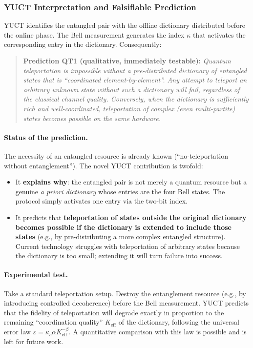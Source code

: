 \documentclass[12pt,a4paper]{article}
\theoremstyle{remark}
\begin{document}
	\subsubsection{YUCT Interpretation and Falsifiable Prediction}
	
	YUCT identifies the entangled pair with the offline dictionary distributed before the online phase. The Bell measurement generates the index $\kappa$ that activates the corresponding entry in the dictionary. Consequently:
	
	\begin{quote}
		\textbf{Prediction QT1 (qualitative, immediately testable):}
		\emph{Quantum teleportation is impossible without a pre-distributed dictionary of entangled states that is ``coordinated element-by-element''. Any attempt to teleport an arbitrary unknown state without such a dictionary will fail, regardless of the classical channel quality. Conversely, when the dictionary is sufficiently rich and well-coordinated, teleportation of complex (even multi-partite) states becomes possible on the same hardware.}
	\end{quote}
	
	\paragraph{Status of the prediction.}
	The necessity of an entangled resource is already known (``no-teleportation without entanglement''). The novel YUCT contribution is twofold:
	
	\begin{itemize}
		\item It \textbf{explains why}: the entangled pair is not merely a quantum resource but a genuine \emph{a priori dictionary} whose entries are the four Bell states. The protocol simply activates one entry via the two-bit index.
		\item It predicts that \textbf{teleportation of states outside the original dictionary becomes possible if the dictionary is extended to include those states} (e.g., by pre-distributing a more complex entangled structure). Current technology struggles with teleportation of arbitrary states because the dictionary is too small; extending it will turn failure into success.
	\end{itemize}
	
	\paragraph{Experimental test.}
	Take a standard teleportation setup. Destroy the entanglement resource (e.g., by introducing controlled decoherence) before the Bell measurement. YUCT predicts that the fidelity of teleportation will degrade exactly in proportion to the remaining ``coordination quality'' $K_{\mathrm{eff}}$ of the dictionary, following the universal error law $\varepsilon = \kappa_c \alpha K_{\mathrm{eff}}^{-\beta}$. A quantitative comparison with this law is possible and is left for future work.
	
\end{document}

